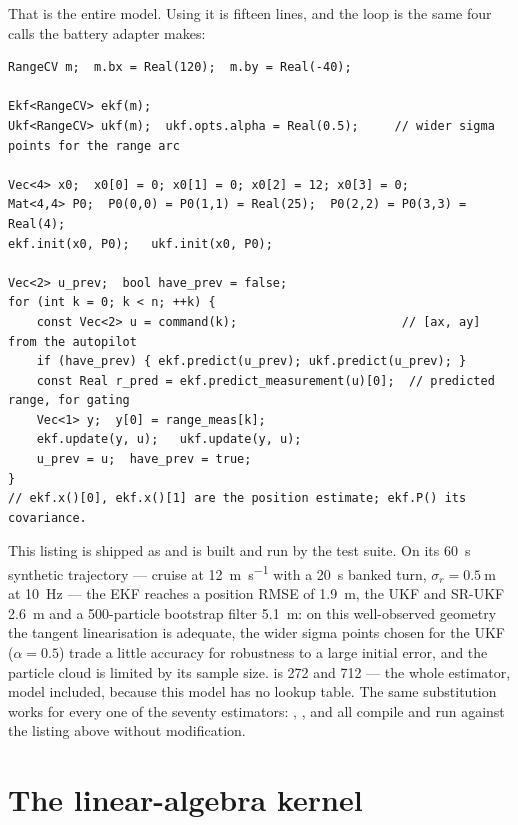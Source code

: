 That is the entire model. Using it is fifteen lines, and the loop is the same four calls the
battery adapter makes:

\begin{lstlisting}
RangeCV m;  m.bx = Real(120);  m.by = Real(-40);

Ekf<RangeCV> ekf(m);
Ukf<RangeCV> ukf(m);  ukf.opts.alpha = Real(0.5);     // wider sigma points for the range arc

Vec<4> x0;  x0[0] = 0; x0[1] = 0; x0[2] = 12; x0[3] = 0;
Mat<4,4> P0;  P0(0,0) = P0(1,1) = Real(25);  P0(2,2) = P0(3,3) = Real(4);
ekf.init(x0, P0);   ukf.init(x0, P0);

Vec<2> u_prev;  bool have_prev = false;
for (int k = 0; k < n; ++k) {
    const Vec<2> u = command(k);                       // [ax, ay] from the autopilot
    if (have_prev) { ekf.predict(u_prev); ukf.predict(u_prev); }
    const Real r_pred = ekf.predict_measurement(u)[0];  // predicted range, for gating
    Vec<1> y;  y[0] = range_meas[k];
    ekf.update(y, u);   ukf.update(y, u);
    u_prev = u;  have_prev = true;
}
// ekf.x()[0], ekf.x()[1] are the position estimate; ekf.P() its covariance.
\end{lstlisting}

This listing is shipped as  and is built and run by the
test suite. On its \SI{60}{\second} synthetic trajectory --- cruise at \SI{12}{\metre\per\second}
with a \SI{20}{\second} banked turn, $\sigma_r=\SI{0.5}{\metre}$ at \SI{10}{\hertz} --- the EKF
reaches a position RMSE of \SI{1.9}{\metre}, the UKF and SR-UKF \SI{2.6}{\metre} and a
500-particle bootstrap filter \SI{5.1}{\metre}: on this well-observed geometry the tangent
linearisation is adequate, the wider sigma points chosen for the UKF ($\alpha=0.5$) trade a
little accuracy for robustness to a large initial error, and the particle cloud is limited by its
sample size.  is \SI{272}{\byte} and 
\SI{712}{\byte} --- the whole estimator, model included, because this model has no lookup table.
The same substitution works for every one of the seventy estimators: ,
,  and  all compile and run
against the listing above without modification.

\section{The linear-algebra kernel}
\label{sec:lib-linalg}

